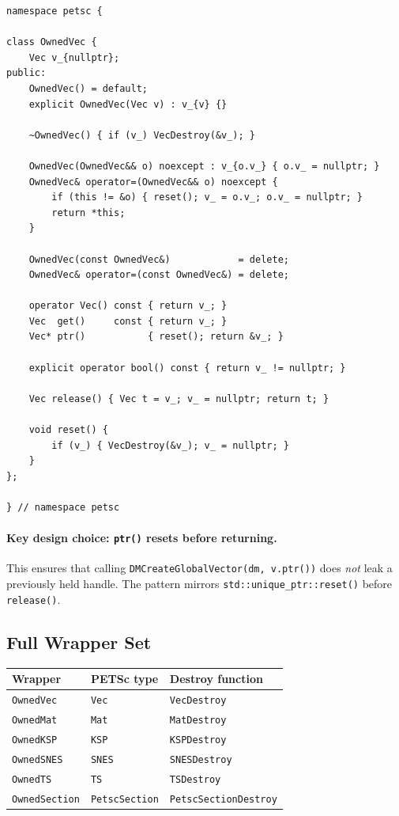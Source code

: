 \begin{verbatim}
namespace petsc {

class OwnedVec {
    Vec v_{nullptr};
public:
    OwnedVec() = default;
    explicit OwnedVec(Vec v) : v_{v} {}

    ~OwnedVec() { if (v_) VecDestroy(&v_); }

    OwnedVec(OwnedVec&& o) noexcept : v_{o.v_} { o.v_ = nullptr; }
    OwnedVec& operator=(OwnedVec&& o) noexcept {
        if (this != &o) { reset(); v_ = o.v_; o.v_ = nullptr; }
        return *this;
    }

    OwnedVec(const OwnedVec&)            = delete;
    OwnedVec& operator=(const OwnedVec&) = delete;

    operator Vec() const { return v_; }
    Vec  get()     const { return v_; }
    Vec* ptr()           { reset(); return &v_; }

    explicit operator bool() const { return v_ != nullptr; }

    Vec release() { Vec t = v_; v_ = nullptr; return t; }

    void reset() {
        if (v_) { VecDestroy(&v_); v_ = nullptr; }
    }
};

} // namespace petsc
\end{verbatim}

\paragraph{Key design choice: \texttt{ptr()} resets before returning.}
This ensures that calling \texttt{DMCreateGlobalVector(dm, v.ptr())}
does \emph{not} leak a previously held handle.  The pattern mirrors
\texttt{std::unique\_ptr::reset()} before \texttt{release()}.

\subsection{Full Wrapper Set}

\begin{center}
\begin{tabular}{lll}
\toprule
\textbf{Wrapper} & \textbf{PETSc type} & \textbf{Destroy function} \\
\midrule
\texttt{OwnedVec}     & \texttt{Vec}           & \texttt{VecDestroy} \\
\texttt{OwnedMat}     & \texttt{Mat}           & \texttt{MatDestroy} \\
\texttt{OwnedKSP}     & \texttt{KSP}           & \texttt{KSPDestroy} \\
\texttt{OwnedSNES}    & \texttt{SNES}          & \texttt{SNESDestroy} \\
\texttt{OwnedTS}      & \texttt{TS}            & \texttt{TSDestroy} \\
\texttt{OwnedSection} & \texttt{PetscSection}  & \texttt{PetscSectionDestroy} \\
\bottomrule
\end{tabular}
\end{center}

